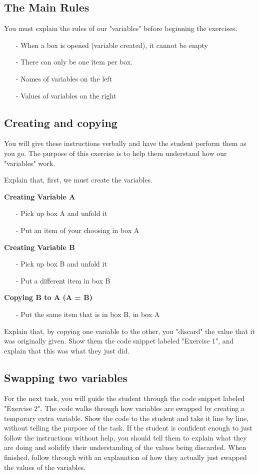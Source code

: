 \subsection*{The Main Rules}
You must explain the rules of our "variables" before beginning the exercises.
\begin{itemize}
    \item[-] When a box is opened (variable created), it cannot be empty
    \item[-] There can only be one item per box.
    \item[-] Names of variables on the left
    \item[-] Values of variables on the right
\end{itemize}



\subsection{Creating and copying}
You will give these instructions verbally and have the student perform them as you go. The purpose of this exercise is to help them understand how our "variables" work.

Explain that, first, we must create the variables.

\textbf{Creating Variable A}
\begin{itemize}
    \item[-] Pick up box A and unfold it
    \item[-] Put an item of your choosing in box A
\end{itemize}

\textbf{Creating Variable B}
\begin{itemize}
    \item[-] Pick up box B and unfold it
    \item[-] Put a different item in box B
\end{itemize}

\textbf{Copying B to A (A = B)}
\begin{itemize}
    \item[-] Put the same item that is in box B, in box A
\end{itemize}

Explain that, by copying one variable to the other, you "discard" the value that it was originally given. Show them the code snippet labeled "Exercise 1", and explain that this was what they just did.

\newpage
\subsection{Swapping two variables}
For the next task, you will guide the student through the code snippet labeled "Exercise 2". The code walks through how variables are swapped by creating a temporary extra variable. Show the code to the student and take it line by line, without telling the purpose of the task. If the student is confident enough to just follow the instructions without help, you should tell them to explain what they are doing and solidify their understanding of the values being discarded. When finished, follow through with an explanation of how they actually just swapped the values of the variables.

